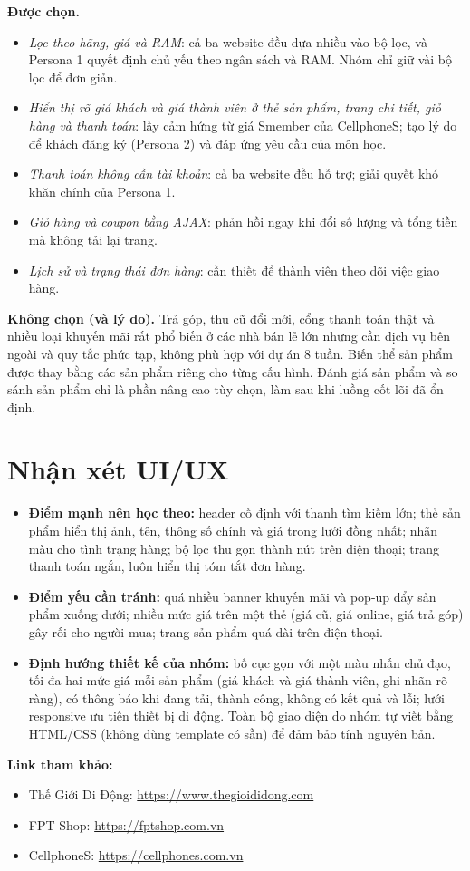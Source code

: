 \documentclass[12pt,a4paper]{article}   %
\begin{document}
\textbf{Được chọn.}
\begin{itemize}
  \item \emph{Lọc theo hãng, giá và RAM}: cả ba website đều dựa nhiều vào bộ lọc, và Persona 1
        quyết định chủ yếu theo ngân sách và RAM. Nhóm chỉ giữ vài bộ lọc để đơn giản.
  \item \emph{Hiển thị rõ giá khách và giá thành viên ở thẻ sản phẩm, trang chi tiết, giỏ hàng và
        thanh toán}: lấy cảm hứng từ giá Smember của CellphoneS; tạo lý do để khách đăng ký
        (Persona 2) và đáp ứng yêu cầu của môn học.
  \item \emph{Thanh toán không cần tài khoản}: cả ba website đều hỗ trợ; giải quyết khó khăn chính của Persona 1.
  \item \emph{Giỏ hàng và coupon bằng AJAX}: phản hồi ngay khi đổi số lượng và tổng tiền mà không tải lại trang.
  \item \emph{Lịch sử và trạng thái đơn hàng}: cần thiết để thành viên theo dõi việc giao hàng.
\end{itemize}

\textbf{Không chọn (và lý do).}
Trả góp, thu cũ đổi mới, cổng thanh toán thật và nhiều loại khuyến mãi rất phổ biến ở các nhà bán
lẻ lớn nhưng cần dịch vụ bên ngoài và quy tắc phức tạp, không phù hợp với dự án 8 tuần. Biến thể
sản phẩm được thay bằng các sản phẩm riêng cho từng cấu hình. Đánh giá sản phẩm và so sánh sản phẩm
chỉ là phần nâng cao tùy chọn, làm sau khi luồng cốt lõi đã ổn định.

\section{Nhận xét UI/UX}

\begin{itemize}
  \item \textbf{Điểm mạnh nên học theo:} header cố định với thanh tìm kiếm lớn; thẻ sản phẩm hiển thị
        ảnh, tên, thông số chính và giá trong lưới đồng nhất; nhãn màu cho tình trạng hàng;
        bộ lọc thu gọn thành nút trên điện thoại; trang thanh toán ngắn, luôn hiển thị tóm tắt đơn hàng.
  \item \textbf{Điểm yếu cần tránh:} quá nhiều banner khuyến mãi và pop-up đẩy sản phẩm xuống dưới;
        nhiều mức giá trên một thẻ (giá cũ, giá online, giá trả góp) gây rối cho người mua;
        trang sản phẩm quá dài trên điện thoại.
  \item \textbf{Định hướng thiết kế của nhóm:} bố cục gọn với một màu nhấn chủ đạo, tối đa hai mức giá
        mỗi sản phẩm (giá khách và giá thành viên, ghi nhãn rõ ràng), có thông báo khi đang tải,
        thành công, không có kết quả và lỗi; lưới responsive ưu tiên thiết bị di động. Toàn bộ giao diện
        do nhóm tự viết bằng HTML/CSS (không dùng template có sẵn) để đảm bảo tính nguyên bản.
\end{itemize}

\textbf{Link tham khảo:}
\begin{itemize}
  \item Thế Giới Di Động: \url{https://www.thegioididong.com}
  \item FPT Shop: \url{https://fptshop.com.vn}
  \item CellphoneS: \url{https://cellphones.com.vn}
\end{itemize}
\end{document}
